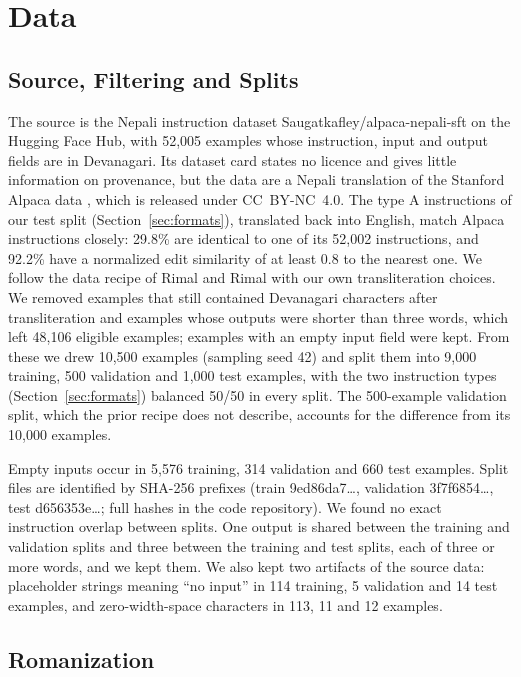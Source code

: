 \documentclass{article}
\begin{document}
\section{Data}\label{sec:data}

\subsection{Source, Filtering and Splits}\label{sec:source}

The source is the Nepali instruction dataset Saugatkafley/alpaca-nepali-sft on the Hugging Face Hub, with 52,005 examples whose instruction, input and output fields are in Devanagari. Its dataset card states no licence and gives little information on provenance, but the data are a Nepali translation of the Stanford Alpaca data \citep{taori2023}, which is released under CC~BY-NC~4.0. The type A instructions of our test split (Section~\ref{sec:formats}), translated back into English, match Alpaca instructions closely: 29.8\% are identical to one of its 52,002 instructions, and 92.2\% have a normalized edit similarity of at least 0.8 to the nearest one. We follow the data recipe of Rimal and Rimal \citep{rimal2026} with our own transliteration choices. We removed examples that still contained Devanagari characters after transliteration and examples whose outputs were shorter than three words, which left 48,106 eligible examples; examples with an empty input field were kept. From these we drew 10,500 examples (sampling seed 42) and split them into 9,000 training, 500 validation and 1,000 test examples, with the two instruction types (Section~\ref{sec:formats}) balanced 50/50 in every split. The 500-example validation split, which the prior recipe does not describe, accounts for the difference from its 10,000 examples.

Empty inputs occur in 5,576 training, 314 validation and 660 test examples. Split files are identified by SHA-256 prefixes (train 9ed86da7\ldots{}, validation 3f7f6854\ldots{}, test d656353e\ldots{}; full hashes in the code repository). We found no exact instruction overlap between splits. One output is shared between the training and validation splits and three between the training and test splits, each of three or more words, and we kept them. We also kept two artifacts of the source data: placeholder strings meaning “no input” in 114 training, 5 validation and 14 test examples, and zero-width-space characters in 113, 11 and 12 examples.

\subsection{Romanization}\label{sec:roman}
\end{document}
